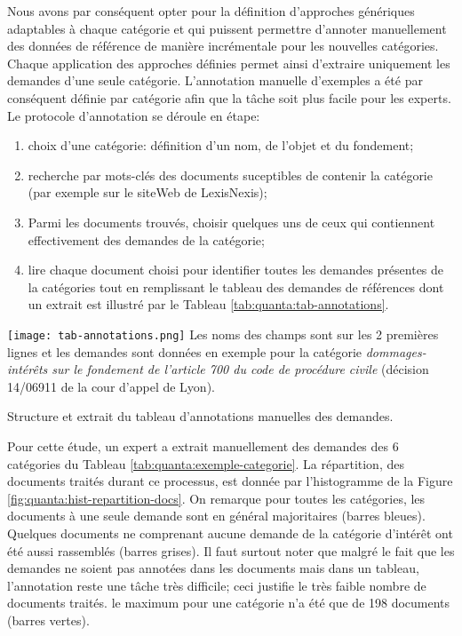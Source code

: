Nous avons par conséquent opter pour la définition d'approches génériques adaptables à chaque catégorie et qui puissent permettre d'annoter manuellement des données de référence de manière incrémentale pour les nouvelles catégories. Chaque application des approches définies permet ainsi d'extraire uniquement les demandes d'une seule catégorie. L'annotation manuelle d'exemples a été par conséquent définie par catégorie afin que la tâche soit plus facile pour les experts. Le protocole d'annotation se déroule en étape: 
\begin{enumerate}
    \item choix d'une catégorie: définition d'un nom, de l'objet et du fondement;
    \item recherche par mots-clés des documents suceptibles de contenir la catégorie (par exemple sur le siteWeb de LexisNexis);
    \item Parmi les documents trouvés, choisir quelques uns de ceux qui contiennent effectivement des demandes de la catégorie; 
    \item lire chaque document choisi pour identifier toutes les demandes présentes de la catégories tout en remplissant le tableau des demandes de références dont un extrait est illustré par le Tableau \ref{tab:quanta:tab-annotations}.
\end{enumerate}

\begin{table}[!htb]
\texttt{[image: tab-annotations.png]}
\scriptsize{Les noms des champs sont sur les 2 premières lignes et les demandes sont données en exemple pour la catégorie \textit{dommages-intérêts sur le fondement de l'article 700 du code de procédure civile} (décision 14/06911 de la cour d'appel de Lyon).}
\caption{Structure et extrait du tableau d'annotations manuelles des demandes.} \label{tab:quanta:tab-annotations}
\end{table}

Pour cette étude, un expert a extrait manuellement des demandes des 6 catégories du Tableau \ref{tab:quanta:exemple-categorie}. La répartition, des documents traités durant ce processus, est donnée par l'histogramme de la Figure \ref{fig:quanta:hist-repartition-docs}. On remarque pour toutes les catégories, les documents à une seule demande sont en général majoritaires (barres bleues). Quelques documents ne comprenant aucune demande de la catégorie d'intérêt ont été aussi rassemblés (barres grises). Il faut surtout noter que malgré le fait que les demandes ne soient pas annotées dans les documents mais dans un tableau, l'annotation reste une tâche très difficile; ceci justifie le très faible nombre de documents traités. le maximum pour une catégorie n'a été que de 198 documents (barres vertes).

